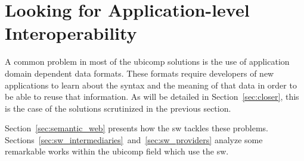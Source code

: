 \section{Looking for Application-level Interoperability}
\label{sec:interoperability}

A common problem in most of the \ac{ubicomp} solutions is the use of application domain dependent data formats.
These formats require developers of new applications to learn about the syntax and the meaning of that data in order to be able to reuse that information.
As will be detailed in Section~\ref{sec:closer}, this is the case of the solutions scrutinized in the previous section.

Section~\ref{sec:semantic_web} presents how the \acl{sw} tackles these problems.
Sections~\ref{sec:sw_intermediaries}~and~\ref{sec:sw_providers} analyze some remarkable works within the \ac{ubicomp} field which use the \ac{sw}.





